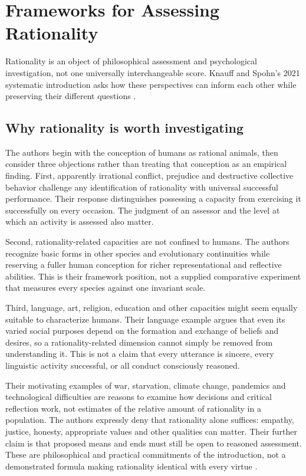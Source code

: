 \chapter{Frameworks for Assessing Rationality}
\label{sec:p11-rationality-intro}

Rationality is an object of philosophical assessment and psychological
investigation, not one universally interchangeable score. Knauff and Spohn's
2021 systematic introduction asks how these perspectives can inform each
other while preserving their different questions
\cite[pp.~1--10]{KnauffSpohn2021FrameworksIntro}.

\section{Why rationality is worth investigating}

The authors begin with the conception of humans as rational animals,
then consider three objections rather than treating that conception as
an empirical finding. First, apparently irrational conflict, prejudice
and destructive collective behavior challenge any identification of
rationality with universal successful performance. Their response
distinguishes possessing a capacity from exercising it successfully on
every occasion. The judgment of an assessor and the level at which
an activity is assessed also matter.

Second, rationality-related capacities are not confined to humans.
The authors recognize basic forms in other species and evolutionary
continuities while reserving a fuller human conception for richer
representational and reflective abilities. This is their framework
position, not a supplied comparative experiment that measures every
species against one invariant scale.

Third, language, art, religion, education and other capacities might
seem equally suitable to characterize humans. Their language example
argues that even its varied social purposes depend on the formation
and exchange of beliefs and desires, so a rationality-related dimension
cannot simply be removed from understanding it. This is not a claim
that every utterance is sincere, every linguistic activity successful,
or all conduct consciously reasoned.

Their motivating examples of war, starvation, climate change, pandemics
and technological difficulties are reasons to examine how decisions
and critical reflection work, not estimates of the relative amount of
rationality in a population. The authors expressly deny that rationality
alone suffices: empathy, justice, honesty, appropriate values and other
qualities can matter. Their further claim is that proposed means and
ends must still be open to reasoned assessment. These are philosophical
and practical commitments of the introduction, not a demonstrated
formula making rationality identical with every virtue
\cite[pp.~1--2]{KnauffSpohn2021FrameworksIntro}.


